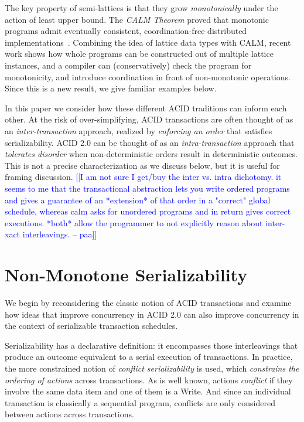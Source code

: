 \documentclass{sig-alternate}
\newcommand{\paa}[1]{{\textcolor{blue}{[[#1 -- paa]]}}}
\begin{document}
The key property of semi-lattices is that they grow \emph{monotonically} under
the action of least upper bound.  The \emph{CALM Theorem} proved that monotonic
programs admit eventually consistent, coordination-free distributed
implementations~\cite{calm}.  Combining the idea of lattice data types with
CALM, recent work shows how whole programs can be constructed out of multiple
lattice instances, and a compiler can (conservatively) check the program for
monotonicity, and introduce coordination in front of non-monotonic operations.
Since this is a new result, we give familiar examples below.

In this paper we consider how these different ACID traditions can inform each
other.  At the risk of over-simplifying, ACID transactions are often thought of
as an \emph{inter-transaction} approach, realized by \emph{enforcing an order}
that satisfies serializability.  ACID 2.0 can be thought of as an
\emph{intra-transaction} approach that \emph{tolerates disorder} when
non-deterministic orders result in deterministic outcomes.  This is not a
precise characterization as we discuss below, but it is useful for framing
discussion.  \paa{I am not sure I get/buy the inter vs. intra dichotomy.  it
  seems to me that the transactional abstraction lets you write ordered programs
  and gives a guarantee of an *extension* of that order in a "correct" global
  schedule, whereas calm asks for unordered programs and in return gives correct
  executions.  *both* allow the programmer to not explicitly reason about
  inter-xact interleavings.}

\section{Non-Monotone Serializability}
We begin by reconsidering the classic notion of ACID transactions and examine
how ideas that improve concurrency in ACID 2.0 can also improve concurrency in
the context of serializable transaction schedules.

Serializability has a declarative definition: it encompasses those interleavings
that produce an outcome equivalent to a serial execution of transactions.  In
practice, the more constrained notion of \emph{conflict serializability} is
used, which \emph{constrains the ordering of actions} across transactions.  As
is well known, actions \emph{conflict} if they involve the same data item and
one of them is a Write.  And since an individual transaction is classically a
sequential program, conflicts are only considered between actions across
transactions.
\end{document}
